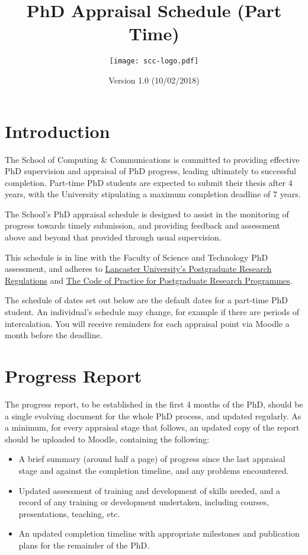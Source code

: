 \documentclass[12pt,a4paper]{article}
\title{PhD Appraisal Schedule (Part Time)}
\author{\texttt{[image: scc-logo.pdf]}}
\date{Version 1.0 (10/02/2018)}
\begin{document}
\maketitle

\section{Introduction}
The School of Computing \& Communications is committed to providing effective PhD supervision and appraisal of PhD progress, leading ultimately to successful completion. Part-time PhD students are expected to submit their thesis after 4 years, with the University stipulating a maximum completion deadline of 7 years.

The School's PhD appraisal schedule is designed to assist in the monitoring of progress towards timely submission, and providing feedback and assessment above and beyond that provided through usual supervision.

This schedule is in line with the Faculty of Science and Technology PhD assessment, and adheres to
\href{https://gap.lancs.ac.uk/ASQ/QAE/MARP/Documents/PGR-Regs.pdf}{Lancaster University's Postgraduate Research Regulations} and 
\href{https://gap.lancs.ac.uk/ASQ/Policies/Documents/Postgraduate-Research-Code-of-Practice.pdf}{The Code of Practice for Postgraduate Research Programmes}.

The schedule of dates set out below are the default dates for a part-time PhD student. An individual's schedule may change, for example if there are periods of intercalation. You will receive reminders for each appraisal point via Moodle a month before the deadline.

\section{Progress Report}
The progress report, to be established in the first 4 months of the PhD, should be a single evolving document for the whole PhD process, and updated regularly. As a minimum, for every appraisal stage that follows, an updated copy of the report should be uploaded to Moodle, containing the following:
\begin{itemize}
	\item A brief summary (around half a page) of progress since the last appraisal stage and against the completion timeline, and any problems encountered.
	\item Updated assessment of training and development of skills needed, and a record of any training or development undertaken, including courses, presentations, teaching, etc.\
	\item An updated completion timeline with appropriate milestones and publication plans for the remainder of the PhD.
\end{itemize}
\end{document}
